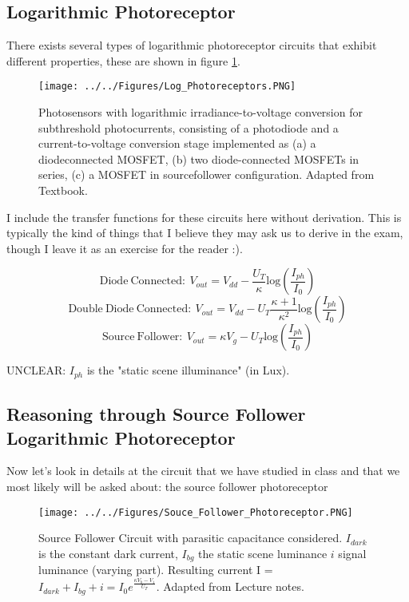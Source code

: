 \subsection{Logarithmic Photoreceptor}

There exists several types of logarithmic photoreceptor circuits that exhibit different properties, these are shown in figure \ref{fig:Log_Photoreceptors}. 

\begin{figure}[H]
    \centering
    \texttt{[image: ../../Figures/Log\_Photoreceptors.PNG]}
    \caption{Photosensors with logarithmic irradiance-to-voltage conversion for subthreshold photocurrents, consisting of a photodiode and a current-to-voltage conversion stage implemented as (a) a diodeconnected MOSFET, (b) two diode-connected MOSFETs in series, (c) a MOSFET in sourcefollower configuration. Adapted from Textbook.}
    \label{fig:Log_Photoreceptors}
\end{figure}

I include the transfer functions for these circuits here without derivation. This is typically the kind of things that I believe they may ask us to derive in the exam, though I leave it as an exercise for the reader :). 

\begin{equation}
    \mathrm{Diode \ Connected:}\ V_{out} = V_{dd} - \frac{U_T}{\kappa}\mathrm{log}(\frac{I_{ph}}{I_0})
\end{equation}
\begin{equation}
    \mathrm{Double \ Diode \ Connected:}\ V_{out} = V_{dd} - U_T\frac{\kappa + 1}{\kappa ^2}\mathrm{log}(\frac{I_{ph}}{I_0})
\end{equation}
\begin{equation}
    \mathrm{Source \ Follower:}\ V_{out} = \kappa V_g - U_T\mathrm{log}(\frac{I_{ph}}{I_0})
\end{equation}

UNCLEAR: $I_{ph}$ is the "static scene illuminance" (in Lux).   

\subsection{Reasoning through Source Follower Logarithmic Photoreceptor}

Now let's look in details at the circuit that we have studied in class and that we most likely will be asked about: the source follower photoreceptor 

\begin{figure}[H]
    \centering
    \texttt{[image: ../../Figures/Souce\_Follower\_Photoreceptor.PNG]}
    \caption{Source Follower Circuit with parasitic capacitance considered. $I_{dark}$ is the constant dark current, $I_{bg}$ the static scene luminance $i$ signal luminance (varying part). Resulting current I = $I_{dark} + I_{bg} + i = I_0e^{\frac{\kappa V_b - V_1}{U_T}}$. Adapted from Lecture notes.}
    \label{fig:Souce_Follower_Photoreceptor}
\end{figure}

